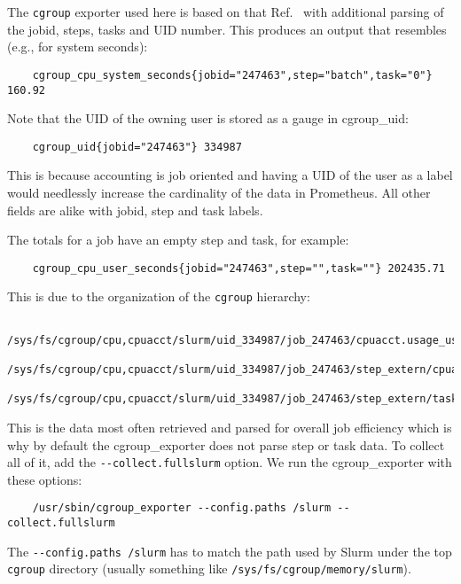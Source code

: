 The \texttt{cgroup} exporter used here is based on that Ref.~\cite{cgroup_trey} with additional parsing of the jobid, steps, tasks and UID number. This produces an output that resembles (e.g., for system seconds):

\begin{verbatim}
    cgroup_cpu_system_seconds{jobid="247463",step="batch",task="0"} 160.92
\end{verbatim}

\noindent
Note that the UID of the owning user is stored as a gauge in cgroup\_uid:

\begin{verbatim}
    cgroup_uid{jobid="247463"} 334987
\end{verbatim}

\noindent
This is because accounting is job oriented and having a UID of the user as a label would needlessly increase the cardinality of the data in Prometheus. All other fields are alike with jobid, step and task labels.

The totals for a job have an empty step and task, for example:

\begin{verbatim}
    cgroup_cpu_user_seconds{jobid="247463",step="",task=""} 202435.71
\end{verbatim}

\noindent
This is due to the organization of the \texttt{cgroup} hierarchy:

\begin{verbatim}
   /sys/fs/cgroup/cpu,cpuacct/slurm/uid_334987/job_247463/cpuacct.usage_user
   /sys/fs/cgroup/cpu,cpuacct/slurm/uid_334987/job_247463/step_extern/cpuacct.usage_user
   /sys/fs/cgroup/cpu,cpuacct/slurm/uid_334987/job_247463/step_extern/task_0/cpuacct.usage_user
\end{verbatim}

This is the data most often retrieved and parsed for overall job efficiency which is why by default the cgroup\_exporter does not parse step or task data. To collect all of it, add the \texttt{-{}-collect.fullslurm} option. We run the cgroup\_exporter with these options:

\begin{verbatim}
    /usr/sbin/cgroup_exporter --config.paths /slurm --collect.fullslurm
\end{verbatim}

\noindent
The \texttt{-{}-config.paths /slurm} has to match the path used by Slurm under the top \texttt{cgroup} directory (usually something like \texttt{/sys/fs/cgroup/memory/slurm}).

